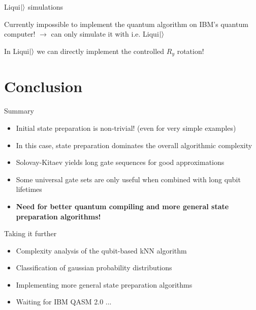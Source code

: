 \documentclass[10pt]{beamer}
\begin{document}
{
\begin{frame}{Liqui$\ket{}$ simulations}
	
Currently impossible to implement the quantum algorithm on IBM's quantum computer!
$\rightarrow$ can only simulate it with i.e. Liqui$\ket{}$

In Liqui$\ket{}$ we can directly implement the controlled $R_y$ rotation!


\end{frame}
}

\section{Conclusion}

\begin{frame}{Summary}
\begin{itemize}
\item Initial state preparation is non-trivial! (even for very simple examples)
\item In this case, state preparation dominates the overall algorithmic complexity
\item Solovay-Kitaev yields long gate sequences for good approximations
\item Some universal gate sets are only useful when combined with long qubit lifetimes
\item \textbf{Need for better quantum compiling and more general state preparation algorithms!}
\end{itemize}
\end{frame}

\begin{frame}{Taking it further}

\begin{itemize}
\item Complexity analysis of the qubit-based kNN algorithm
\item Classification of gaussian probability distributions
\item Implementing more general state preparation algorithms
\item Waiting for IBM QASM 2.0 ...
\end{itemize}
\end{frame}
\end{document}
